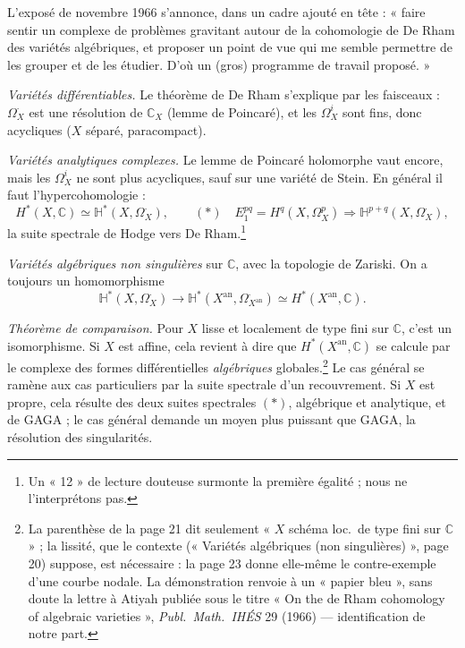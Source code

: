 \documentclass[11pt,a4paper]{article}
\begin{document}
L'exposé de novembre 1966 s'annonce, dans un cadre ajouté en tête : « faire
sentir un complexe de problèmes gravitant autour de la cohomologie de De Rham
des variétés algébriques, et proposer un point de vue qui me semble permettre
de les grouper et de les étudier. D'où un (gros) programme de travail
proposé. »

\emph{Variétés différentiables.} Le théorème de De Rham s'explique par les
faisceaux : $\Omega^{\cdot}_X$ est une résolution de $\mathbb{C}_X$ (lemme de
Poincaré), et les $\Omega^{i}_X$ sont fins, donc acycliques ($X$ séparé,
paracompact).

\emph{Variétés analytiques complexes.} Le lemme de Poincaré holomorphe vaut
encore, mais les $\Omega^{i}_X$ ne sont plus acycliques, sauf sur une variété
de Stein. En général il faut l'hypercohomologie :
\[
  H^{*}(X, \mathbb{C}) \simeq \mathbb{H}^{*}(X, \Omega^{\cdot}_X) ,
  \qquad
  (*)\quad E_{1}^{pq} = H^{q}(X, \Omega^{p}_X) \Longrightarrow
  \mathbb{H}^{p+q}(X, \Omega^{\cdot}_X) ,
\]
la suite spectrale de Hodge vers De Rham.\footnote{Un « 12 » de lecture
douteuse surmonte la première égalité ; nous ne l'interprétons pas.}

\emph{Variétés algébriques non singulières} sur $\mathbb{C}$, avec la
topologie de Zariski. On a toujours un homomorphisme
\[
  \mathbb{H}^{*}(X, \Omega^{\cdot}_X) \longrightarrow
  \mathbb{H}^{*}(X^{\mathrm{an}}, \Omega^{\cdot}_{X^{\mathrm{an}}})
  \simeq H^{*}(X^{\mathrm{an}}, \mathbb{C}) .
\]

\emph{Théorème de comparaison.} Pour $X$ lisse et localement de type fini sur
$\mathbb{C}$, c'est un isomorphisme. Si $X$ est affine, cela revient à dire
que $H^{*}(X^{\mathrm{an}}, \mathbb{C})$ se calcule par le complexe des formes
différentielles \emph{algébriques} globales.\footnote{La parenthèse de la
page 21 dit seulement « $X$ schéma loc.\ de type fini sur $\mathbb{C}$ » ;
la lissité, que le contexte (« Variétés algébriques (non singulières) »,
page 20) suppose, est nécessaire : la page 23 donne elle-même le
contre-exemple d'une courbe nodale. La démonstration renvoie à un « papier
bleu », sans doute la lettre à Atiyah publiée sous le titre « On the de Rham
cohomology of algebraic varieties », \emph{Publ.\ Math.\ IHÉS} 29 (1966) —
identification de notre part.} Le cas général se ramène aux cas
particuliers par la suite spectrale d'un recouvrement. Si $X$ est propre,
cela résulte des deux suites spectrales $(*)$, algébrique et analytique, et
de GAGA ; le cas général demande un moyen plus puissant que GAGA, la
résolution des singularités.
\end{document}
